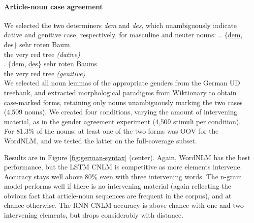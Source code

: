 \paragraph{Article-noun case agreement}
We selected the two determiners \emph{dem} and \emph{des}, which
unambiguously indicate dative and genitive case, respectively, for
masculine and neuter nouns: %
\ex.\ag. {\{\underline{dem}, des\}} sehr roten Baum \\
the very red {tree \emph{(dative)}} \\
\bg. {\{dem, \underline{des}\}} sehr roten Baums \\
the very red {tree \emph{(genitive)}} \\



%

We selected all noun lemmas of the appropriate genders from the German
UD treebank, and extracted morphological paradigms from Wiktionary to
obtain case-marked forms, retaining only nouns unambiguously marking
the two cases (4,509 nouns).  We created four conditions, varying the amount of
intervening material, as in the gender agreement experiment (4,509
stimuli per condition).  For 81.3\% of the nouns, at least one of the
two forms was OOV for the WordNLM, and we tested the latter on the
full-coverage subset.

Results are in Figure \ref{fig:german-syntax} (center).  Again,
WordNLM has the best performance, but the LSTM CNLM is competitive as
more elements intervene. Accuracy stays well above 80\% even with
three intervening words.  The n-gram model performs well if there is
no intervening material (again reflecting the obvious fact that
article-noun sequences are frequent in the corpus), and at chance
otherwise.  The RNN CNLM accuracy is above chance with one and two
intervening elements, but drops considerably with distance.

